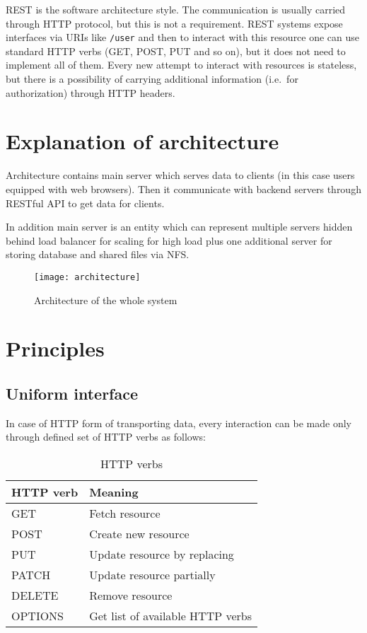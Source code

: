 REST is the software architecture style\cite{REST-wiki}. The communication is usually carried through HTTP protocol, but this is not a requirement. REST systems expose interfaces via URIs like\label{example-URI} \verb|/user| and then to interact with this resource one can use standard HTTP verbs (GET, POST, PUT and so on), but it does not need to implement all of them. Every new attempt to interact with resources is stateless, but there is a possibility of carrying additional information (i.e.\ for authorization) through HTTP headers.

\section{Explanation of architecture}
Architecture contains main server which serves data to clients (in this case users equipped with web browsers). Then it communicate with backend servers through RESTful API to get data for clients.

In addition main server is an entity which can represent multiple servers hidden behind load balancer for scaling for high load plus one additional server for storing database and shared files via NFS\@.

\begin{figure}[!htbp]
\centering
\texttt{[image: architecture]}
\label{fig:architecture}
\caption{Architecture of the whole system}
\end{figure}


\section{Principles}

\subsection{Uniform interface}
\label{uniform-interface}
In case of HTTP form of transporting data, every interaction can be made only through defined set of HTTP verbs as follows:

\begin{table}[!htbp]
\centering
\begin{tabular}{ll} \toprule
 HTTP verb &  Meaning \\ \midrule
 GET & Fetch resource \\
 POST & Create new resource \\
 PUT & Update resource by replacing \\
 PATCH & Update resource partially \\
 DELETE & Remove resource \\
 OPTIONS & Get list of available HTTP verbs \\ \bottomrule
\end{tabular}
\caption{HTTP verbs}
\label{tab:http-verbs}
\end{table}

